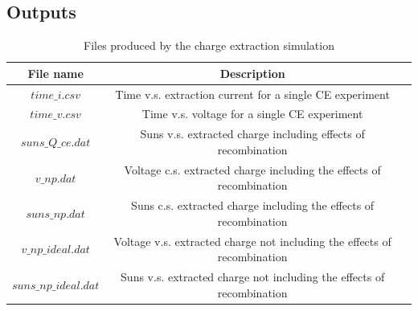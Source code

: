 \subsection{Outputs}


\begin{table}[H]
\begin{center}
\begin{tabular}{ |c|c|c| } 
 \hline
	File name 			& 	Description  \\ 
 \hline
	$time\_i.csv$ 		&	Time v.s. extraction current for a single CE experiment\\ 
	$time\_v.csv$ 		&	Time v.s. voltage for a single CE experiment\\ 
	$suns\_Q\_ce.dat$ 	&	Suns v.s. extracted charge including effects of recombination\\ 
	$v\_np.dat$ 			&	Voltage c.s. extracted charge including the effects of recombination \\
	$suns\_np.dat$ 		&	Suns c.s. extracted charge including the effects of recombination   \\
	$v\_np\_ideal.dat$ 	&	Voltage v.s. extracted charge not including the effects of recombination\\
	$suns\_np\_ideal.dat$ &	Suns v.s. extracted charge not including the effects of recombination\\
 \hline
\end{tabular}
\caption{Files produced by the charge extraction simulation}
\label{tab:ce_output}
\end{center}
\end{table}
